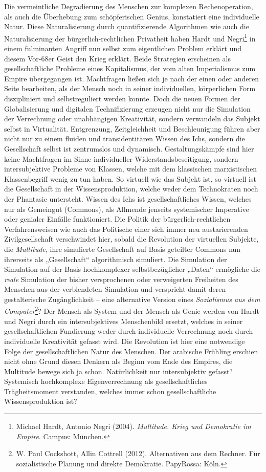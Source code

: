 \documentclass[12pt,a4paper]{article}
\begin{document}
Die vermeintliche Degradierung des Menschen zur komplexen Rechenoperation, als
auch die Überhebung zum schöpferischen Genius, konstatiert eine individuelle
Natur. Diese Naturalisierung durch quantifizierende Algorithmen wie auch die
Naturalisierung der bürgerlich-rechtlichen Privatheit haben Hardt und
Negri\footnote{Michael Hardt, Antonio Negri (2004). \emph{Multitude.  Krieg
    und Demokratie im Empire}.  Campus: München. } in einem fulminanten
Angriff nun selbst zum eigentlichen Problem erklärt und diesem Vor-68er Geist
den Krieg erklärt. Beide Strategien erscheinen als gesellschaftliche Probleme
eines Kapitalismus, der vom alten Imperialismus zum Empire übergegangen ist.
Machtfragen ließen sich je nach der einen oder anderen Seite bearbeiten, als
der Mensch noch in seiner individuellen, körperlichen Form diszipliniert und
selbstreguliert werden konnte. Doch die neuen Formen der Globalisierung und
digitalen Technifizierung erzeugen nicht nur die Simulation der Verrechnung
oder unabhängigen Kreativität, sondern verwandeln das Subjekt selbst in
Virtualität.  Entgrenzung, Zeitgleichheit und Beschleunigung führen aber nicht
nur zu einem fluiden und trans\-identitären Wissen des Ichs, sondern die
Gesellschaft selbst ist zentrumslos und dynamisch.  Gestaltungskämpfe sind
hier keine Machtfragen im Sinne individueller Widerstandsbeseitigung, sondern
intersubjektive Probleme von Klassen, welche mit dem klassischen marxistischen
Klassenbegriff wenig zu tun haben. So virtuell wie das Subjekt ist, so
virtuell ist die Gesellschaft in der Wissensproduktion, welche weder dem
Technokraten noch der Phantasie untersteht. Wissen des Ichs ist
gesellschaftliches Wissen, welches nur als Gemeingut (Commons), als Allmende
jenseits systemischer Imperative oder genialer Einfälle funktioniert.  Die
Politik der bürgerlich-rechtlichen Verfahrensweisen wie auch das Politische
einer sich immer neu austarierenden Zivilgesellschaft verschwindet hier,
sobald die Revolution der virtuellen Subjekte, die \emph{Multitude}, ihre
simulierte Gesellschaft auf Basis geteilter Commons nun ihrerseits als
„Gesellschaft“ algorithmisch simuliert. Die Simulation der Simulation auf der
Basis hochkomplexer selbstbezüglicher „Daten“ ermögliche die \emph{reale}
Simulation der bisher versprochenen oder verweigerten Freiheiten des Menschen
aus der verblendeten Simulation und verspricht damit deren gestalterische
Zugänglichkeit -- eine alternative Version eines \emph{Sozialismus aus dem
  Computer}\footnote{W. Paul Cockshott, Allin Cottrell (2012). Alternativen
  aus dem Rechner. Für sozialistische Planung und direkte
  Demokratie. PapyRossa: Köln.}? Der Mensch als System und der Mensch als
Genie werden von Hardt und Negri durch ein intersubjektives Menschenbild
ersetzt, welches in seiner gesellschaftlichen Fundierung weder durch
individuelle Verrechnung noch durch individuelle Kreativität gefasst wird. Die
Revolution ist hier eine notwendige Folge der gesellschaftlichen Natur des
Menschen. Der arabische Frühling erschien nicht ohne Grund diesen Denkern als
Beginn vom Ende des Empires, die Multitude bewege sich ja schon.
Natürlichkeit nur intersubjektiv gefasst? Systemisch hochkomplexe
Eigenverrechnung als gesellschaftliches Trägheitsmoment verstanden, welches
immer schon gesellschaftliche Wissensproduktion ist?
\end{document}
